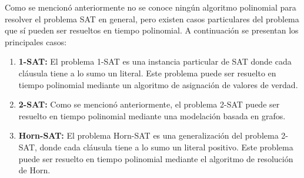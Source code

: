 \documentclass{article}
\begin{document}
Como se mencionó anteriormente no se conoce ningún algoritmo polinomial para resolver el problema SAT en general, pero
existen casos particulares del problema que sí pueden ser resueltos en tiempo polinomial. A continuación se presentan los
principales casos:

\begin{enumerate}
      \item \textbf{1-SAT:} El problema 1-SAT es una instancia particular de SAT donde cada cláusula tiene a lo sumo un literal.
            Este problema puede ser resuelto en tiempo polinomial mediante un algoritmo de asignación de valores de verdad.
      \item \textbf{2-SAT:} Como se mencionó anteriormente, el problema 2-SAT puede ser resuelto en tiempo polinomial mediante
            una modelación basada en grafos.
      \item \textbf{Horn-SAT:} El problema Horn-SAT es una generalización del problema 2-SAT, donde cada cláusula tiene a lo sumo
            un literal positivo. Este problema puede ser resuelto en tiempo polinomial mediante el algoritmo de resolución de Horn.
\end{enumerate}



\end{document}
